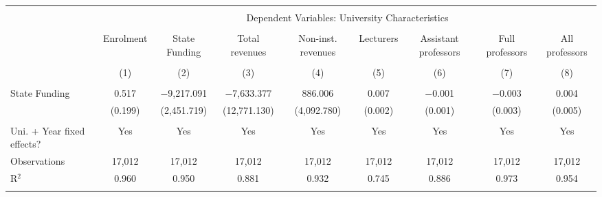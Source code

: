 
\begin{tabular}{@{\extracolsep{5pt}}lcccccccc} 
\\[-1.8ex]\hline 
\hline \\[-1.8ex] 
 & \multicolumn{8}{c}{Dependent Variables: University Characteristics} \\ 
\cline{2-9} 
\\[-1.8ex] & Enrolment & State Funding & Total revenues & Non-inst. revenues & Lecturers & Assistant professors & Full professors & All professors \\ 
\\[-1.8ex] & (1) & (2) & (3) & (4) & (5) & (6) & (7) & (8)\\ 
\hline \\[-1.8ex] 
 State Funding & 0.517 & $-$9,217.091 & $-$7,633.377 & 886.006 & 0.007 & $-$0.001 & $-$0.003 & 0.004 \\ 
  & (0.199) & (2,451.719) & (12,771.130) & (4,092.780) & (0.002) & (0.001) & (0.003) & (0.005) \\ 
 \hline \\[-1.8ex] 
Uni. + Year fixed effects? & Yes & Yes & Yes & Yes & Yes & Yes & Yes & Yes \\ 
Observations & 17,012 & 17,012 & 17,012 & 17,012 & 17,012 & 17,012 & 17,012 & 17,012 \\ 
R$^{2}$ & 0.960 & 0.950 & 0.881 & 0.932 & 0.745 & 0.886 & 0.973 & 0.954 \\ 
\hline 
\hline \\[-1.8ex] 
\end{tabular} 
